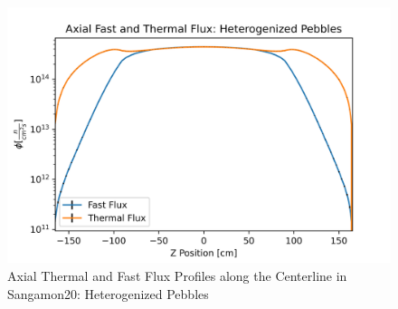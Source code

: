 \begin{figure}[H]
\centering

  \includegraphics[width=0.95\linewidth]{figures/fast_therm_flux_het_z.png}

\caption{Axial Thermal and Fast Flux Profiles along the Centerline in Sangamon20: Heterogenized Pebbles}
\label{fig:het-det-z}
\end{figure}